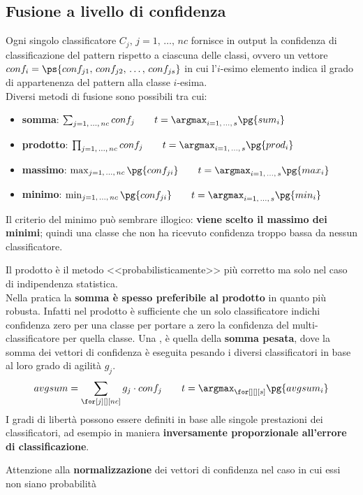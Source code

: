 \subsection{Fusione a livello di confidenza}\label{sec:fusione_a_livello_di_confidenza} %
Ogni singolo classificatore $C_j,\,j= 1,\,\dots,\,nc$ fornisce in output la confidenza di classificazione del pattern rispetto a ciascuna delle classi, ovvero un vettore $conf_i = \ps{conf_{j1},\,conf_{j2},\,\dots,\,conf_{js}}$ in cui l'$i$-esimo elemento indica il grado di appartenenza del pattern alla classe $i$-esima.
\\
Diversi metodi di fusione sono possibili tra cui:
\begin{itemize}
    \item \textbf{somma}: $\sum_{j=1,\,\dots,\,nc}{conf_j}\qquad t = \argmax_{i=1,\,\dots,\,s}{\pg{sum_i}}$
    \item \textbf{prodotto}: $\prod_{j=1,\,\dots,\,nc}{conf_j}\qquad t = \argmax_{i=1,\,\dots,\,s}{\pg{prod_i}}$
    \item \textbf{massimo}: $\max_{j=1,\,\dots,\,nc}{\pg{conf_{ji}}}\qquad t = \argmax_{i=1,\,\dots,\,s}{\pg{max_i}}$
    \item \textbf{minimo}: $\min_{j=1,\,\dots,\,nc}{\pg{conf_{ji}}}\qquad t = \argmax_{i=1,\,\dots,\,s}{\pg{min_i}}$
\end{itemize}
\begin{note}
    Il criterio del minimo può sembrare illogico: \textbf{viene scelto il massimo dei minimi}; quindi una classe che non ha ricevuto confidenza troppo bassa da nessun classificatore.
\end{note}
Il prodotto è il metodo <<probabilisticamente>> più corretto ma solo nel caso di indipendenza statistica.
\\
Nella pratica la \textbf{somma è spesso preferibile al prodotto} in quanto più robusta.
Infatti nel prodotto è sufficiente che un solo classificatore indichi confidenza zero per una classe per portare a zero la confidenza del multi-classificatore per quella classe.
\emptyln{}
Una , è quella della \textbf{somma pesata}, dove la somma dei vettori di confidenza è eseguita pesando i diversi classificatori in base al loro grado di agilità $g_j$.
\[
    avgsum = \sum_{\for[j][][nc]}{g_j \cdot conf_j} \qquad t = \argmax_{\for[][][s]}{\pg{avgsum_i}}
\]
I gradi di libertà possono essere definiti in base alle singole prestazioni dei classificatori, ad esempio in maniera \textbf{inversamente proporzionale all'errore di classificazione}.
\begin{warning}
    Attenzione alla \textbf{normalizzazione} dei vettori di confidenza nel caso in cui essi non siano probabilità
\end{warning}
%
